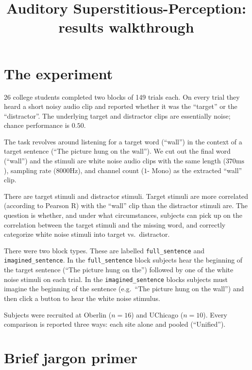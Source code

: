 \documentclass[11pt]{article}
\title{Auditory Superstitious-Perception: results walkthrough}
\author{}
\date{}
\begin{document}
\maketitle
\tableofcontents
\bigskip

\section{The experiment}

26 college students completed two blocks of 149 trials each. On every
trial they heard a short noisy audio clip and reported whether it was the
``target'' or the ``distractor''. The underlying target and distractor
clips are essentially noise; chance performance is $0.50$.

The task revolves around listening for a target word (``wall'') in the context of a target sentence (``The picture hung on the wall'').
We cut out the final word (``wall'') and the stimuli are white noise audio clips with the
same length ($370 \text{ms}$), sampling rate ($8000 \text{Hz}$), and channel count ($1 \text{- Mono}$) as the extracted ``wall'' clip. 

There are target stimuli and distractor stimuli.
Target stimuli are more correlated (according to Pearson R) with the ``wall'' clip than the distractor stimuli are.
The question is whether, and under what circumstances, subjects can pick up on the correlation between
the target stimuli and the missing word, and correctly categorize white noise stimuli into target vs.\ distractor.

There were two block types. These are labelled \texttt{full\_sentence} and \texttt{imagined\_sentence}. 
In the \texttt{full\_sentence} block subjects hear the beginning of the target
sentence (``The picture hung on the'') followed by one of the white noise stimuli on each trial.
In the \texttt{imagined\_sentence} blocks subjects must imagine the beginning of
the sentence (e.g.\ ``The picture hung on the wall'') and then click a button to hear the white noise stimulus.


Subjects were recruited at Oberlin ($n = 16$) and UChicago ($n = 10$). Every comparison is reported three ways: each site
alone and pooled (``Unified'').

\section{Brief jargon primer}
\end{document}
